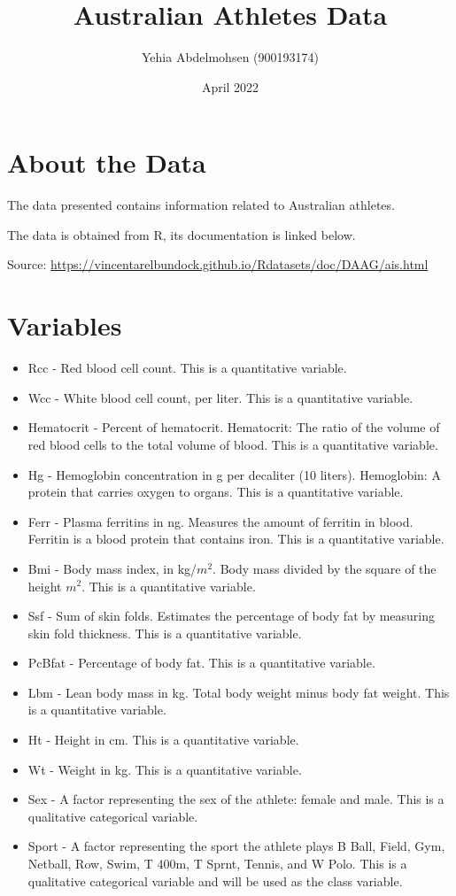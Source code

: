 \documentclass{article}
\title{Australian Athletes Data}
\author{Yehia Abdelmohsen (900193174)}
\date{April 2022}
\begin{document}
\maketitle

\section{About the Data}
The data presented contains information related to Australian athletes. 
\newline
\par
\noindent
The data is obtained from R, its documentation is linked below.
\newline
\par
\noindent
Source: \url{https://vincentarelbundock.github.io/Rdatasets/doc/DAAG/ais.html}


\section{Variables}
\begin{itemize}
    \item Rcc - Red blood cell count. This is a quantitative variable.
    \item Wcc - White blood cell count, per liter. This is a quantitative variable.
    \item Hematocrit - Percent of hematocrit. Hematocrit: The ratio of the volume of red blood cells to the total volume of blood. This is a quantitative variable.
    \item Hg - Hemoglobin concentration in g per decaliter (10 liters). Hemoglobin: A protein that carries oxygen to organs. This is a quantitative variable.
    \item Ferr - Plasma ferritins in ng. Measures the amount of ferritin in blood. Ferritin is a blood protein that contains iron. This is a quantitative variable.
    \item Bmi - Body mass index, in kg/\(m^2\). Body mass divided by the square of the height \(m^2\). This is a quantitative variable.
    \item Ssf - Sum of skin folds. Estimates the percentage of body fat by measuring skin fold thickness. This is a quantitative variable.
    \item PcBfat - Percentage of body fat. This is a quantitative variable.
    \item Lbm - Lean body mass in kg. Total body weight minus body fat weight. This is a quantitative variable.
    \item Ht - Height in cm. This is a quantitative variable.
    \item Wt - Weight in kg. This is a quantitative variable.
    \item Sex - A factor representing the sex of the athlete: female and male. This is a qualitative categorical variable.
    \item Sport - A factor representing the sport the athlete plays B Ball, Field, Gym, Netball, Row, Swim, T 400m, T Sprnt, Tennis, and W Polo. This is a qualitative categorical variable and will be used as the class variable.
\end{itemize}
\end{document}

